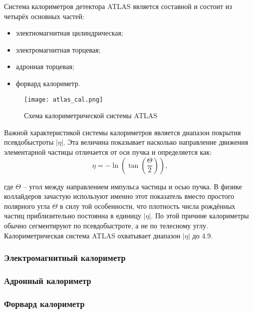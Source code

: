 Система калориметров детектора ATLAS является составной и состоит из четырёх основных частей:
\begin {itemize}
    \item электномагнитная цилиндрическая;
    \item электромагнитная торцевая;
    \item адронная торцевая;
    \item форвард калориметр.
\end{itemize}\par
\begin{figure}[ht]
    \centering
    \texttt{[image: atlas\_cal.png]}
    \caption{Схема калориметрической системы ATLAS}
    \label{fig:atlas_cal}
\end{figure}
Важной характеристикой системы калориметров является диапазон покрытия псевдобыстроты $|\eta|$. Эта величина показывает насколько направление движения элементарной частицы отличается от оси пучка и определяется как:
\begin{equation}
    \eta = -\ln(\tan(\frac{\Theta}{2})),
\end{equation}\par
где $\Theta$ -- угол между направлением импульса частицы и осью пучка. В физике коллайдеров зачастую используют именно этот показатель вместо простого полярного угла $\Theta$ в силу той особенности, что плотность числа рождённых частиц приблизительно постоянна в единицу $|\eta|$. По этой причине калориметры обычно сегментируют по псевдобыстроте, а не по телесному углу. Калориметрическая система ATLAS охватывает диапазон $|\eta|$ до 4.9.

\subsubsection{Электромагнитный калориметр}


\subsubsection{Адронный калориметр}


\subsubsection{Форвард калориметр}

